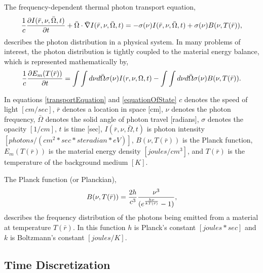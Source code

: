 \noindent
	\indent The frequency-dependent thermal photon transport equation,
	\begin{equation}
	\label{transportEquation}
	{1\over{c}}{\partial{I(\bar{r},\nu,\bar{\Omega},t)}\over{\partial{t}}}+\bar{\Omega}\cdot\bar{\nabla}{I(\bar{r},\nu,\bar{\Omega},t)}=-\sigma(\nu)I(\bar{r},\nu,\bar{\Omega},t)+\sigma(\nu){B(\nu,T(\bar{r}))},
	\end{equation}
	\noindent describes the photon distribution in a physical system. In many problems of interest, the photon distribution is tightly coupled to the material energy balance, which is represented mathematically by,
	\begin{equation}
	\label{equationOfState}
	{1\over{c}}{\partial{E_m(T(\bar{r}))}\over{\partial{t}}}={\int\int{d\nu}{d\bar{\Omega}}\sigma(\nu)I(r,\nu,\Omega,t)-\int\int{d\nu}d\bar{\Omega}\sigma(\nu)B(\nu,T(\bar{r}))}.
	\end{equation}

	In equations \ref{transportEquation} and \ref{equationOfState} $c$ denotes the speed of light $[cm/sec]$, $\bar{r}$ denotes a location in space [cm],  $\nu$ denotes the photon frequency, $\bar{\Omega}$ denotes the solid angle of photon travel [radians], $\sigma$ denotes the opacity $[1/cm]$, $t$ is time [sec], $I(\bar{r},\nu,\bar{\Omega},t)$ is photon intensity $[photons/(cm^2*sec*steradian*eV)]$, $B(\nu,T(\bar{r}))$ is the Planck function, $E_m(T(\bar{r}))$ is the material energy density $[joules/cm^3]$, and $T(\bar{r})$ is the temperature of the background medium $[K]$.
	
	The Planck function (or Planckian),
	\begin{equation}
	\label{Planck}
	{B(\nu,T(\bar{r}))}={2h\over{c^3}}{\nu^3\over{(e^{h\nu\over{kT(\bar{r})}}-1)}},
	\end{equation}
	\noindent describes the frequency distribution of the photons being emitted from a material at temperature $T(\bar{r})$. In this function $h$ is Planck's constant $[joules*sec]$ and $k$ is Boltzmann's constant $[joules/K]$.

\belowSubSecSkip

\subsection{Time Discretization}
\label{sec:Transport-Time-Discretization}

